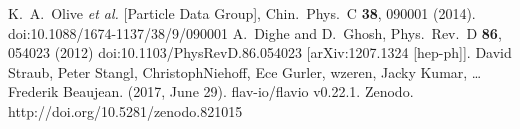 \documentclass[12pt]{article}
\begin{document}
\begin{enumerate}
\begin{thebibliography}{9}
  K.~A.~Olive {\it et al.} [Particle Data Group],
  Chin.\ Phys.\ C {\bf 38}, 090001 (2014).
  doi:10.1088/1674-1137/38/9/090001
  A.~Dighe and D.~Ghosh,
  Phys.\ Rev.\ D {\bf 86}, 054023 (2012)
  doi:10.1103/PhysRevD.86.054023
  [arXiv:1207.1324 [hep-ph]].
    David Straub, Peter Stangl, ChristophNiehoff, Ece Gurler, wzeren, Jacky Kumar, … Frederik Beaujean. (2017, June 29). flav-io/flavio v0.22.1. Zenodo. http://doi.org/10.5281/zenodo.821015
\end{thebibliography}
\end{enumerate}
\end{document}

